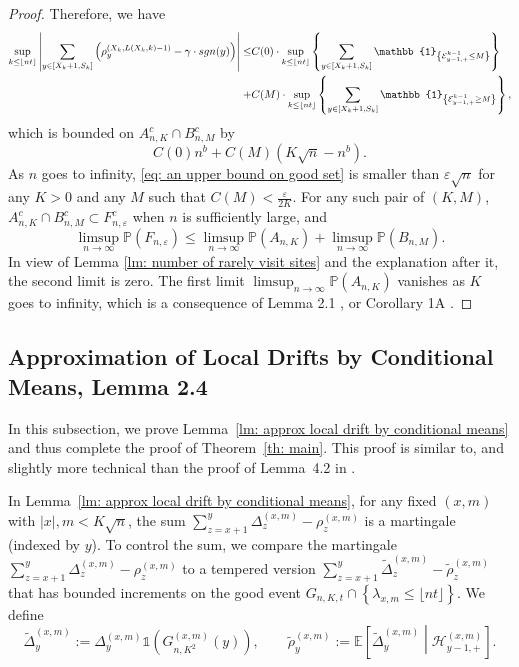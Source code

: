 \documentclass[EJP]{ejpecp} %
\newcommand{\abs}[1]{\left\vert #1 \right\vert}
\begin{document}
\begin{proof}
	Therefore, we have
	\begin{align*}
		\sup_{k\leq \left\lfloor n t\right\rfloor}  \abs{  	\sum_{y\in [X_{k}+1 ,S_k]} \left( \rho^{(X_k,L(X_k,k)-1)}_y -  \gamma \cdot sgn(y) \right) } \leq &  
		C(0) \cdot \sup_{k\leq \left\lfloor n t\right\rfloor} \left\{   	\sum_{y\in [X_{k}+1 ,S_k]} \mathbb{1}_{ \left\{ \mathcal{E}^{k-1}_{y-1,+} \leq M \right\} } \right\}
		\notag
		\\
		+& C(M) \cdot \sup_{k\leq \left\lfloor n t\right\rfloor} \left\{   	\sum_{y\in [X_{k}+1 ,S_k]} \mathbb{1}_{ \left\{ \mathcal{E}^{k-1}_{y-1,+} \geq M \right\} } \right\},
	\end{align*} which is bounded on $A^c_{n,K} \cap B^c_{n,M}$ by
	\begin{equation}\label{eq: an upper bound on good set}
		C(0)n^b  + C(M) \left(K \sqrt{n} -n^b\right).
	\end{equation} 
	As $n$ goes to infinity, \eqref{eq: an upper bound on good set} is smaller than $\varepsilon \sqrt{n}$ for any $K>0$ and any $M$ such that $C(M) < \frac{\varepsilon}{2K}$. 
	For any such pair of $(K,M)$, $A^c_{n,K} \cap B^c_{n,M} \subset F^c_{n,\varepsilon}$ when $n$ is sufficiently large, and 
	\[
	\limsup_{n\to \infty} \mathbb{P}(F_{n,\varepsilon}) \leq \limsup_{n\to \infty}  \mathbb{P}(A_{n,K}) +  \limsup_{n\to \infty}  \mathbb{P}(B_{n,M}).
	\]
	In view of Lemma \ref{lm: number of rarely visit sites} and the explanation after it, the second limit is zero. The first limit $\limsup_{n\to \infty}  \mathbb{P}(A_{n,K}) $ vanishes as $K$ goes to infinity, which is a consequence of Lemma 2.1 \cite{KMP23}, or Corollary 1A \cite{T96}.
\end{proof}


\subsection{Approximation of Local Drifts by Conditional Means, Lemma 2.4}
\label{sec:DeltaRho}
In this subsection, we prove Lemma~\ref{lm: approx local drift by conditional means} and thus complete the proof of Theorem~\ref{th: main}. This proof is similar to, and slightly more technical than the proof of {Lemma~4.2} in \cite{KP16}. 

In Lemma~\ref{lm: approx local drift by conditional means}, for any fixed $(x,m)$ with $\abs{x},m < K\sqrt{n}$, the sum $\sum_{z=x+1}^{y}  \Delta_z^{(x,m)} - \rho_z^{(x,m)}  $ is a martingale (indexed by $y$). To control the sum, we compare the martingale $\sum_{z=x+1}^{y} \Delta_z^{(x,m)} - \rho_z^{(x,m)}$ to a tempered version $\sum_{z= x+1}^y \tilde \Delta_{z}^{(x,m)} - \tilde\rho_z^{(x,m)}$ that has bounded increments on the good event $G_{n, K, t} \cap \left\{\lambda_{x,m} \leq\lfloor nt \rfloor \right\}$. We define
\[
\tilde \Delta_y^{(x,m)} := \Delta_y ^{(x,m)} \mathbb{1}\left( G_{n, K^2}^{(x,m)} (y)\right), \qquad
\tilde \rho_y^{(x,m)} := \mathbb{E}\left[ \tilde\Delta_y^{(x,m)} \middle| \mathcal{H}_{y-1, +}^{(x,m)} \right]  
.\] 
\end{document}
